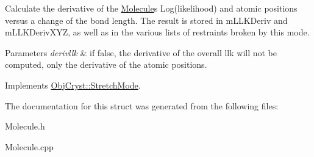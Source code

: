 Calculate the derivative of the \mbox{\hyperlink{class_obj_cryst_1_1_molecule}{Molecule}}\textquotesingle{}s Log(likelihood) and atomic positions versus a change of the bond length. The result is stored in m\+L\+L\+K\+Deriv and m\+L\+L\+K\+Deriv\+X\+YZ, as well as in the various lists of restraints broken by this mode.


\begin{DoxyParams}{Parameters}
{\em derivllk} & if false, the derivative of the overall llk will not be computed, only the derivative of the atomic positions. \\
\hline
\end{DoxyParams}


Implements \mbox{\hyperlink{struct_obj_cryst_1_1_stretch_mode_a5b5ab5f9819c047a49719a330722d419}{Obj\+Cryst\+::\+Stretch\+Mode}}.



The documentation for this struct was generated from the following files\+:\begin{DoxyCompactItemize}
\item 
Molecule.\+h\item 
Molecule.\+cpp\end{DoxyCompactItemize}
